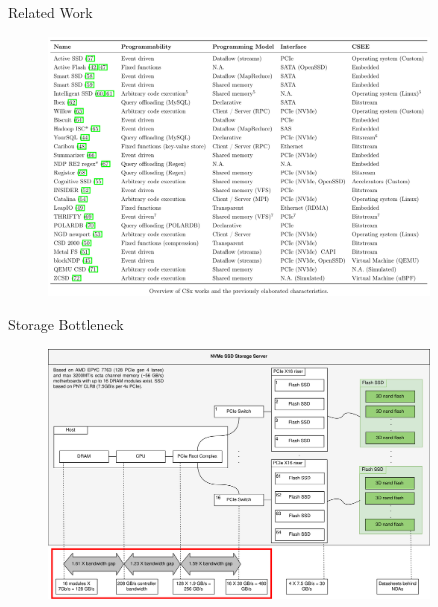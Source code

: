 \documentclass{beamer}
\begin{document}
% 
\begin{frame}{Related Work}
	\begingroup
	\begin{figure}
		\centering
		\includegraphics[width=0.9\textwidth]{resources/images/related-work.png}
	\end{figure}
	\endgroup
\end{frame}

% 
\begin{frame}{Storage Bottleneck}
	\begingroup
	\begin{figure}
		\centering
		\includegraphics[width=0.9\textwidth]{resources/images/storage-bottleneck.png}
	\end{figure}
	\endgroup
\end{frame}
\end{document}
